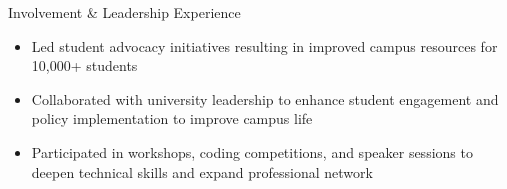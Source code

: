 \documentclass{resume}
\begin{document}
\begin{experienceSection}{Involvement \& Leadership Experience}
    \projectItem[
        title={Student Senate Committee for Student Affairs},
    ]
    \begin{itemize}[topsep=0pt, itemsep=-6pt, leftmargin=1.2em, rightmargin=0.8em, before=\raggedright, after=\normalfont]
        \vspace{-0.5em}
        \item Led student advocacy initiatives resulting in improved campus resources for 10,000+ students
        \item Collaborated with university leadership to enhance student engagement and policy implementation to improve campus life
    \end{itemize}
    \vspace{-0.5em}
    \projectItem[
        title={Association for Computing Machinery},
    ]
    \begin{itemize}[topsep=0pt, itemsep=-6pt, leftmargin=1.2em, rightmargin=0.8em, before=\raggedright, after=\normalfont]
        \vspace{-0.5em}
        \item Participated in workshops, coding competitions, and speaker sessions to deepen technical skills and expand professional network
    \end{itemize}
\end{experienceSection}
\end{document}
